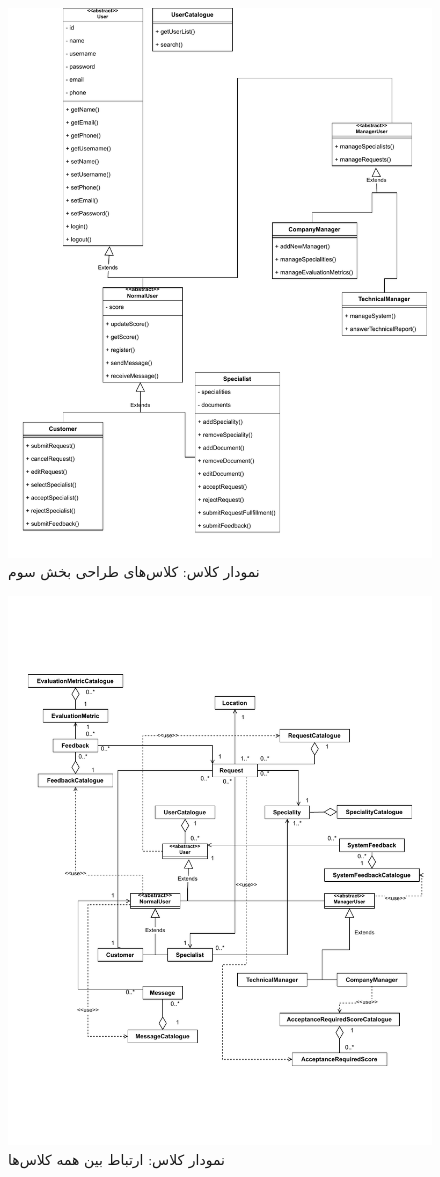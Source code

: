 \begin{figure}[ht!]
	\centering
	\includegraphics[scale=0.8]{figs/OOD-class-page-3.pdf}
	\caption{نمودار کلاس: کلاس‌های طراحی بخش سوم}
\end{figure}
\FloatBarrier
\newpage

\begin{figure}[ht!]
	\centering
	\includegraphics[scale=0.8]{figs/OOD-class-page-4.pdf}
	\caption{نمودار کلاس: ارتباط بین همه کلاس‌ها}
\end{figure}
\FloatBarrier
\newpage